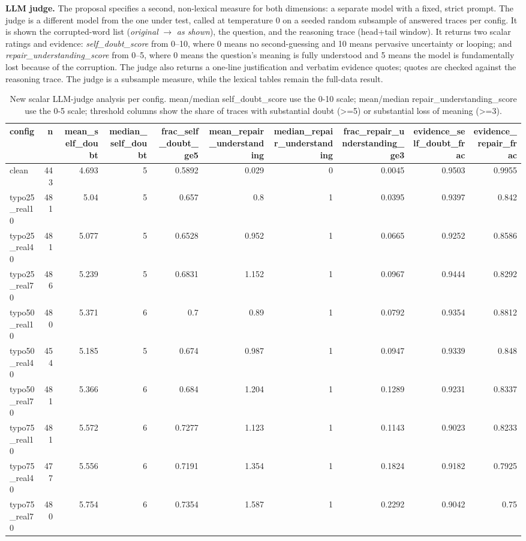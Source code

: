 \documentclass[11pt]{article}
\begin{document}
\noindent\textbf{LLM judge.} The proposal specifies a second,
non-lexical measure for both dimensions: a separate model with a fixed, strict prompt.
The judge is a different model from the one under test, called at temperature 0 on a
seeded random subsample of answered traces per config. It is shown the corrupted-word
list (\emph{original} $\to$ \emph{as shown}), the question, and the reasoning trace
(head+tail window). It returns two scalar ratings and evidence: \emph{self\_doubt\_score}
from 0--10, where 0 means no second-guessing and 10 means pervasive uncertainty or
looping; and \emph{repair\_understanding\_score} from 0--5, where 0 means the question's
meaning is fully understood and 5 means the model is fundamentally lost because of the
corruption. The judge also returns a one-line justification and verbatim evidence quotes;
quotes are checked against the reasoning trace. The judge is a subsample measure, while
the lexical tables remain the full-data result.
\medskip

\begin{table}[H]
\centering
\caption{New scalar LLM-judge analysis per config. mean/median self\_doubt\_score use the 0-10 scale; mean/median repair\_understanding\_score use the 0-5 scale; threshold columns show the share of traces with substantial doubt (>=5) or substantial loss of meaning (>=3).}
\small
\begin{adjustbox}{max width=\textwidth}
\begin{tabular}{lrrrrrrrrr}
\toprule
\textbf{config} & \textbf{n} & \textbf{mean\_self\_doubt} & \textbf{median\_self\_doubt} & \textbf{frac\_self\_doubt\_ge5} & \textbf{mean\_repair\_understanding} & \textbf{median\_repair\_understanding} & \textbf{frac\_repair\_understanding\_ge3} & \textbf{evidence\_self\_doubt\_frac} & \textbf{evidence\_repair\_frac} \\
\midrule
clean & 443 & 4.693 & 5 & 0.5892 & 0.029 & 0 & 0.0045 & 0.9503 & 0.9955 \\
typo25\_real10 & 481 & 5.04 & 5 & 0.657 & 0.8 & 1 & 0.0395 & 0.9397 & 0.842 \\
typo25\_real40 & 481 & 5.077 & 5 & 0.6528 & 0.952 & 1 & 0.0665 & 0.9252 & 0.8586 \\
typo25\_real70 & 486 & 5.239 & 5 & 0.6831 & 1.152 & 1 & 0.0967 & 0.9444 & 0.8292 \\
typo50\_real10 & 480 & 5.371 & 6 & 0.7 & 0.89 & 1 & 0.0792 & 0.9354 & 0.8812 \\
typo50\_real40 & 454 & 5.185 & 5 & 0.674 & 0.987 & 1 & 0.0947 & 0.9339 & 0.848 \\
typo50\_real70 & 481 & 5.366 & 6 & 0.684 & 1.204 & 1 & 0.1289 & 0.9231 & 0.8337 \\
typo75\_real10 & 481 & 5.572 & 6 & 0.7277 & 1.123 & 1 & 0.1143 & 0.9023 & 0.8233 \\
typo75\_real40 & 477 & 5.556 & 6 & 0.7191 & 1.354 & 1 & 0.1824 & 0.9182 & 0.7925 \\
typo75\_real70 & 480 & 5.754 & 6 & 0.7354 & 1.587 & 1 & 0.2292 & 0.9042 & 0.75 \\
\bottomrule
\end{tabular}
\end{adjustbox}
\end{table}
\end{document}
